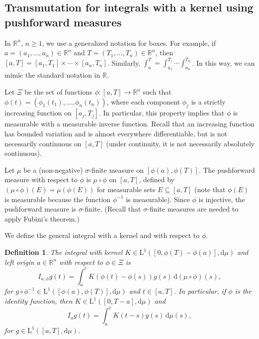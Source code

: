 \documentclass[12pt,reqno]{amsart}
\theoremstyle{plain}
\newtheorem{definition}[theorem]{Definition}
\numberwithin{equation}{section} %
\begin{document}
\subsection{Transmutation for integrals with a kernel using pushforward measures}

In $\mathbb{R}^n$, $n\geq 1$, we use a generalized notation for boxes. For example, if $a=(a_1,\ldots,a_n)\in\mathbb{R}^n$ and $T=(T_1,\ldots,T_n)\in\mathbb{R}^n$, then $[a,T]=[a_1,T_1]\times\cdots\times [a_n,T_n]$. Similarly, $\int_a^T=\int_{a_1}^{T_1}\cdots \int_{a_n}^{T_n}$. In this way, we can mimic the standard notation in $\mathbb{R}$.

Let $\Xi$ be the set of functions $\phi:[a,T]\rightarrow\mathbb{R}^n$ such that $\phi(t)=(\phi_1(t_1),\ldots,\phi_n(t_n))$, where each component $\phi_j$ is a strictly increasing function on $[a_j,T_j]$. In particular, this property implies that $\phi$ is measurable with a measurable inverse function. Recall that an increasing function has bounded variation and is almost everywhere differentiable, but is not necessarily continuous on $[a,T]$ (under continuity, it is not necessarily absolutely continuous).

Let $\mu$ be a (non-negative) $\sigma$-finite measure on $[\phi(a),\phi(T)]$. The pushforward measure with respect to $\phi$ \cite[Section~3.6]{boga} is $\mu\circ \phi$ on $[a,T]$, defined by $(\mu\circ \phi)(E)=\mu(\phi(E))$ for measurable sets $E\subseteq [a,T]$ (note that $\phi(E)$ is measurable because the function $\phi^{-1}$ is measurable). Since $\phi$ is injective, the pushforward measure is $\sigma$-finite. (Recall that $\sigma$-finite measures are needed to apply Fubini's theorem.)

We define the general integral with a kernel and with respect to $\phi$.

\begin{definition} \label{def1}
The integral with kernel $K\in\mathrm{L}^1([0,\phi(T)-\phi(a)],\mathrm{d}\mu)$ and left origin $a\in\mathbb{R}^n$ with respect to $\phi\in\Xi$ is
\begin{equation}
 I_{a,\phi} g(t)=\int_a^t K(\phi(t)-\phi(s))g(s)\,\mathrm{d}(\mu\circ \phi)(s), \label{eq1}
\end{equation}
for $g\circ\phi^{-1}\in\mathrm{L}^1([\phi(a),\phi(T)],\mathrm{d}\mu)$ and $t\in [a,T]$. In particular, if $\phi$ is the identity function, then $K\in\mathrm{L}^1([0,T-a],\mathrm{d}\mu)$ and
\begin{equation} 
I_{a}g(t)=\int_{a}^{t} K(t-s)g(s)\,\mathrm{d}\mu(s), 
\label{eq2}
\end{equation}
for $g\in\mathrm{L}^1([a,T],\mathrm{d}\mu)$.
\end{definition}
\end{document}
